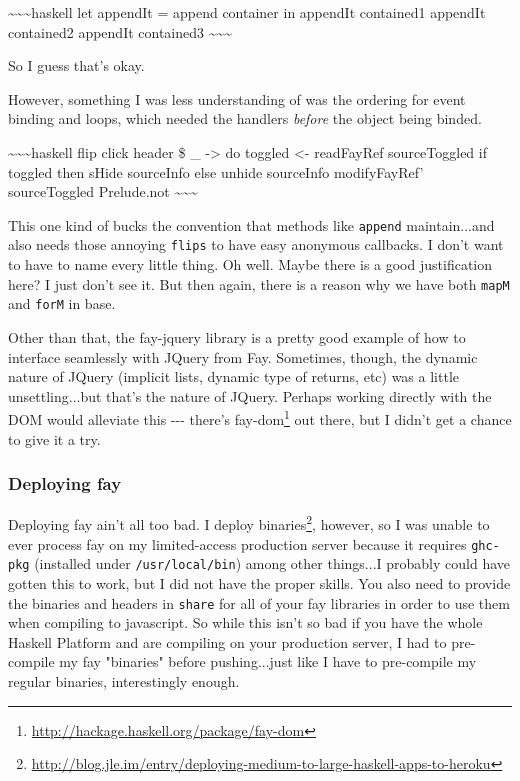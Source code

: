 \documentclass[]{article}
\renewcommand{\href}[2]{#2\footnote{\url{#1}}}
\begin{document}
\textasciitilde{}\textasciitilde{}\textasciitilde{}haskell let appendIt = append
container in appendIt contained1 appendIt contained2 appendIt contained3
\textasciitilde{}\textasciitilde{}\textasciitilde{}

So I guess that's okay.

However, something I was less understanding of was the ordering for event
binding and loops, which needed the handlers \emph{before} the object being
binded.

\textasciitilde{}\textasciitilde{}\textasciitilde{}haskell flip click header \$
\_ -\textgreater{} do toggled \textless{}- readFayRef sourceToggled if toggled
then sHide sourceInfo else unhide sourceInfo modifyFayRef' sourceToggled
Prelude.not \textasciitilde{}\textasciitilde{}\textasciitilde{}

This one kind of bucks the convention that methods like \texttt{append}
maintain...and also needs those annoying \texttt{flips} to have easy anonymous
callbacks. I don't want to have to name every little thing. Oh well. Maybe there
is a good justification here? I just don't see it. But then again, there is a
reason why we have both \texttt{mapM} and \texttt{forM} in base.

Other than that, the fay-jquery library is a pretty good example of how to
interface seamlessly with JQuery from Fay. Sometimes, though, the dynamic nature
of JQuery (implicit lists, dynamic type of returns, etc) was a little
unsettling...but that's the nature of JQuery. Perhaps working directly with the
DOM would alleviate this -\/-\/- there's
\href{http://hackage.haskell.org/package/fay-dom}{fay-dom} out there, but I
didn't get a chance to give it a try.

\subsubsection{Deploying fay}

Deploying fay ain't all too bad. I
\href{http://blog.jle.im/entry/deploying-medium-to-large-haskell-apps-to-heroku}{deploy
binaries}, however, so I was unable to ever process fay on my limited-access
production server because it requires \texttt{ghc-pkg} (installed under
\texttt{/usr/local/bin}) among other things...I probably could have gotten this
to work, but I did not have the proper skills. You also need to provide the
binaries and headers in \texttt{share} for all of your fay libraries in order to
use them when compiling to javascript. So while this isn't so bad if you have
the whole Haskell Platform and are compiling on your production server, I had to
pre-compile my fay "binaries" before pushing...just like I have to pre-compile
my regular binaries, interestingly enough.
\end{document}
